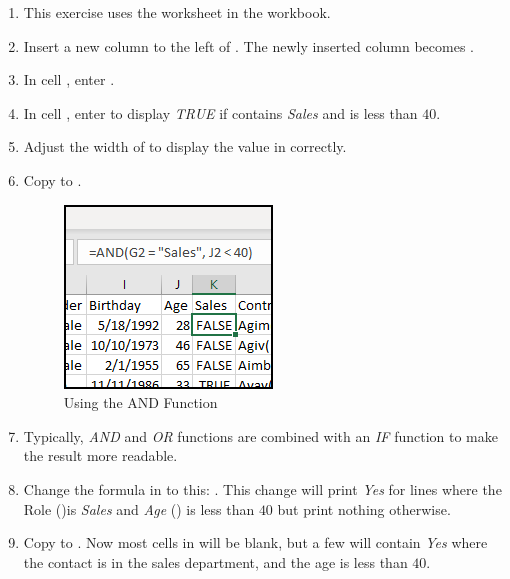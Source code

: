 \begin{enumbox}
	\begin{enumerate}
		\item This exercise uses the  worksheet in the  workbook.
		\item Insert a new column to the left of . The newly inserted column becomes .
		\item In cell , enter .
		\item In cell , enter  to display \textit{TRUE} if  contains \textit{Sales} and  is less than $ 40 $. 
		\item Adjust the width of  to display the value in  correctly.
		\item Copy  to .
		
		\begin{figure}[H]
			\centering
			\includegraphics[width=\maxwidth{.50\linewidth}]{gfx/ch09_fig47}
			\caption{Using the AND Function}
			\label{09:fig47}
		\end{figure}
	
		\item Typically, \textit{AND} and \textit{OR} functions are combined with an \textit{IF} function to make the result more readable.
		\item Change the formula in  to this: . This change will print \textit{Yes} for lines where the Role ()is \textit{Sales} and \textit{Age} () is less than $ 40 $ but print nothing otherwise. 
		\item Copy  to . Now most cells in  will be blank, but a few will contain \textit{Yes} where the contact is in the sales department, and the age is less than $ 40 $.
	\end{enumerate}
\end{enumbox}
	
